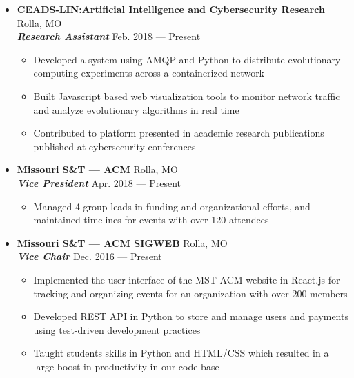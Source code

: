 \documentclass[9pt,oneside]{memoir}
\begin{document}
\begin{itemize}
    \item[] \textbf{CEADS-LIN:\@ Artificial Intelligence and Cybersecurity Research}
    \hfill Rolla, MO\\
    \textit{\textbf{Research Assistant}}
    \hfill Feb. 2018 --- Present
    \begin{itemize}
      \item[\textbullet] Developed a system using AMQP and Python to distribute evolutionary computing experiments across a containerized network
      \item[\textbullet] Built Javascript based web visualization tools to monitor network traffic and analyze evolutionary algorithms in real time
      \item[\textbullet] Contributed to platform presented in academic research publications published at cybersecurity conferences
    \end{itemize}

  \item[] \textbf{Missouri S\&T --- ACM}
      \hfill Rolla, MO\\
      \textit{\textbf{Vice President}}
      \hfill Apr. 2018 --- Present
      \begin{itemize}
          \item[\textbullet] Managed 4 group leads in funding and organizational efforts, and maintained timelines for events with over 120 attendees
      \end{itemize}

  \item[] \textbf{Missouri S\&T --- ACM SIGWEB}
    \hfill Rolla, MO\\
    \textit{\textbf{Vice Chair}}
    \hfill Dec. 2016 --- Present
    \begin{itemize}
      \item[\textbullet] Implemented the user interface of the MST-ACM website in React.js for tracking and organizing events for an organization with over 200 members
      \item[\textbullet] Developed REST API in Python to store and manage users and payments using test-driven development practices
      \item[\textbullet] Taught students skills in Python and HTML/CSS which resulted in a large boost in productivity in our code base
    \end{itemize}
\end{itemize}
\end{document}
